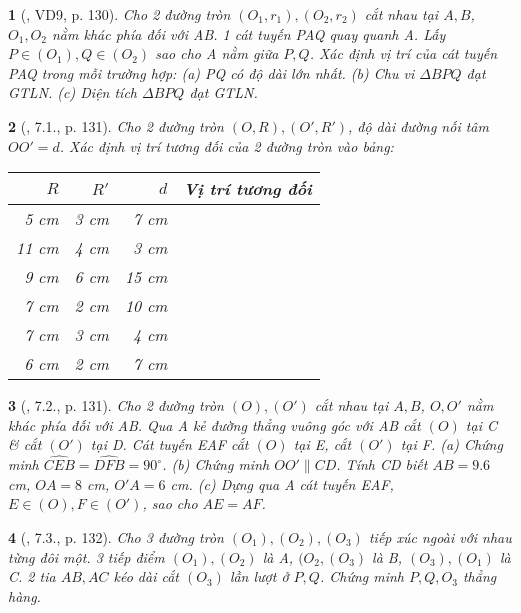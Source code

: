 \documentclass{article}
\newtheorem{baitoan}{}
\begin{document}
\begin{baitoan}[\cite{Binh_boi_duong_Toan_9_tap_1}, VD9, p. 130]
	Cho 2 đường tròn $(O_1,r_1),(O_2,r_2)$ cắt nhau tại $A,B$, $O_1,O_2$ nằm khác phía đối với AB. 1 cát tuyến PAQ quay quanh A. Lấy $P\in(O_1),Q\in(O_2)$ sao cho A nằm giữa $P,Q$. Xác định vị trí của cát tuyến PAQ trong mỗi trường hợp: (a) PQ có độ dài lớn nhất. (b) Chu vi $\Delta BPQ$ đạt {\rm GTLN}. (c) Diện tích $\Delta BPQ$ đạt {\rm GTLN}.
\end{baitoan}

\begin{baitoan}[\cite{Binh_boi_duong_Toan_9_tap_1}, 7.1., p. 131]
	Cho 2 đường tròn $(O,R),(O',R')$, độ dài đường nối tâm $OO' = d$. Xác định vị trí tương đối của 2 đường tròn vào bảng:
	\begin{table}[H]
		\centering
		\begin{tabular}{|r|r|r|c|}
			\hline
			$R$ & $R'$ & $d$ & Vị trí tương đối \\
			\hline
			5 cm & 3 cm & 7 cm &  \\
			\hline
			11 cm & 4 cm & 3 cm &  \\
			\hline
			9 cm & 6 cm & 15 cm &  \\
			\hline
			7 cm & 2 cm & 10 cm &  \\
			\hline
			7 cm & 3 cm & 4 cm &  \\
			\hline
			6 cm & 2 cm & 7 cm &  \\
			\hline
		\end{tabular}
	\end{table}
\end{baitoan}

\begin{baitoan}[\cite{Binh_boi_duong_Toan_9_tap_1}, 7.2., p. 131]
	Cho 2 đường tròn $(O),(O')$ cắt nhau tại $A,B$, $O,O'$ nằm khác phía đối với AB. Qua A kẻ đường thẳng vuông góc với AB cắt $(O)$ tại C \& cắt $(O')$ tại D. Cát tuyến EAF cắt $(O)$ tại E, cắt $(O')$ tại F. (a) Chứng minh $\widehat{CEB} = \widehat{DFB} = 90^\circ$. (b) Chứng minh $OO'\parallel CD$. Tính CD biết $AB = 9.6$ {\rm cm}, $OA = 8$  {\rm cm}, $O'A = 6$ {\rm cm}. (c) Dựng qua A cát tuyến EAF, $E\in(O),F\in(O')$, sao cho $AE = AF$.
\end{baitoan}

\begin{baitoan}[\cite{Binh_boi_duong_Toan_9_tap_1}, 7.3., p. 132]
	Cho 3 đường tròn $(O_1),(O_2),(O_3)$ tiếp xúc ngoài với nhau từng đôi một. 3 tiếp điểm $(O_1),(O_2)$ là A, $(O_2,(O_3)$ là B, $(O_3),(O_1)$ là C. 2 tia $AB,AC$ kéo dài cắt $(O_3)$ lần lượt ở $P,Q$. Chứng minh $P,Q,O_3$ thẳng hàng.
\end{baitoan}
\end{document}
